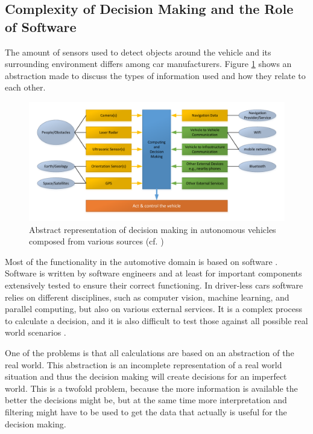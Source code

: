 \subsection{Complexity of Decision Making and the Role of Software}
\label{sec:SelfDrivingCarsBasics:ComplexityOfDecisionMaking}

The amount of sensors used to detect objects around the vehicle and its surrounding environment differs among car manufacturers. Figure \ref{fig:DecisionMaking} shows an abstraction made to discuss the types of information used and how they relate to each other. 

\begin{figure}
\centering
\includegraphics[width=1\linewidth]{Figures/Figures_V20171008_DecisionMaking.pdf}
\caption{Abstract representation of decision making in autonomous vehicles composed from various sources (cf.  \cite{EarthImagingJournalEIJ:RemoteSensingSatelliteImages2012,Waldrop2015,Waymo2017technology,Tesla2016_upgrade})}
\label{fig:DecisionMaking}
\end{figure}

Most of the functionality in the automotive domain is based on software \cite{Broy2007}. Software is written by software engineers and at least for important components extensively tested to ensure their correct functioning. In driver-less cars software relies on different disciplines, such as computer vision, machine learning, and parallel computing, but also on various external services. It is a complex process to calculate a decision, and it is also difficult to test those against all possible real world scenarios \cite{Waldrop2015}. 

One of the problems is that all calculations are based on an abstraction of the real world. This abstraction is an incomplete representation of a real world situation and thus the decision making will create decisions for an imperfect world. This is a twofold problem, because the more information is available the better the decisions might be, but at the same time more interpretation and filtering might have to be used to get the data that actually is useful for the decision making. 

